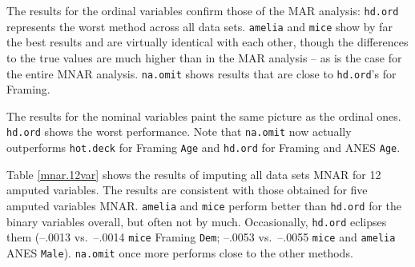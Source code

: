 \documentclass[12pt,econ]{sources/authesis}
\begin{document}
The results for the ordinal variables confirm those of the MAR analysis: \texttt{hd.ord} represents the worst method across all data sets. \texttt{amelia} and \texttt{mice} show by far the best results and are virtually identical with each other, though the differences to the true values are much higher than in the MAR analysis -- as is the case for the entire MNAR analysis. \texttt{na.omit} shows results that are close to \texttt{hd.ord}'s for Framing.

The results for the nominal variables paint the same picture as the ordinal ones. \texttt{hd.ord} shows the worst performance. Note that \texttt{na.omit} now actually outperforms \texttt{hot.deck} for Framing \texttt{Age} and \texttt{hd.ord} for Framing and ANES \texttt{Age}.

Table \ref{mnar.12var} shows the results of imputing all data sets MNAR for 12 amputed variables. The results are consistent with those obtained for five amputed variables MNAR. \texttt{amelia} and \texttt{mice} perform better than \texttt{hd.ord} for the binary variables overall, but often not by much. Occasionally, \texttt{hd.ord} eclipses them (--.0013 vs.~--.0014 \texttt{mice} Framing \texttt{Dem}; --.0053 vs.~--.0055 \texttt{mice} and \texttt{amelia} ANES \texttt{Male}). \texttt{na.omit} once more performs close to the other methods.

\ssp
\end{document}
